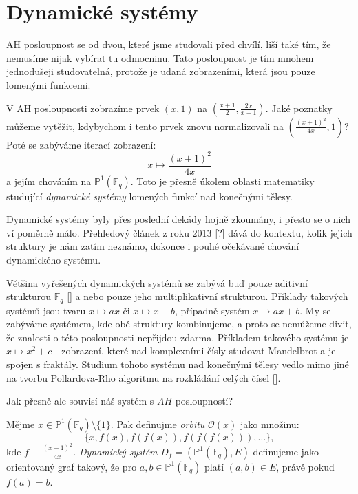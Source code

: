\documentclass[12pt]{report}
\begin{document}
\section{Dynamické systémy}

AH posloupnost se od dvou, které jsme studovali před chvílí, liší také tím, že nemusíme nijak vybírat tu  odmocninu. Tato posloupnost je tím mnohem jednodušeji studovatelná, protože je udaná zobrazeními, která jsou pouze lomenými funkcemi. 
  
V AH posloupnosti zobrazíme prvek $(x,1)$ na $\left(\frac{x+1}{2}, \frac{2x}{x+1}\right)$. Jaké poznatky můžeme vytěžit, kdybychom i tento prvek znovu normalizovali na $\left ( \frac{(x+1)^2}{4x}, 1 \right)$? Poté se zabýváme iterací zobrazení:
$$x \longmapsto \frac{(x+1)^2}{4x}$$
a jejím chováním na $\mathbb{P}^1 ( \mathbb{F}_q)$. Toto je přesně úkolem oblasti matematiky studující \textit{dynamické systémy} lomených funkcí nad konečnými tělesy.

Dynamické systémy byly přes poslední dekády hojně zkoumány, i přesto se o nich ví poměrně málo. Přehledový článek z roku 2013 [?] dává do kontextu, kolik jejich struktury je nám zatím neznámo, dokonce i pouhé očekávané chování dynamického systému. 

Většina vyřešených dynamických systémů se zabývá buď pouze aditivní strukturou $\mathbb{F}_q$ [] a nebo pouze jeho multiplikativní strukturou. Příklady takových systémů jsou tvaru $x \longmapsto ax$ či $x \longmapsto x+b$, případně systém $x \longmapsto ax+b$. My se zabýváme systémem, kde obě struktury kombinujeme, a proto se nemůžeme divit, že znalosti o této posloupnosti nepřijdou zdarma. Příkladem takového systému je $x \longmapsto x^2+c$ - zobrazení, které nad komplexními čísly studovat Mandelbrot a je spojen s fraktály. Studium tohoto systému nad konečnými tělesy vedlo mimo jiné na tvorbu Pollardova-Rho algoritmu na rozkládání celých čísel [].

Jak přesně ale souvisí náš systém s $AH$ posloupností? 

\begin{definice}
Mějme $x \in \mathbb{P}^{1}(\mathbb{F}_q) \setminus \lbrace 1 \rbrace$. Pak definujme \textit{orbitu} $\mathcal{O}(x)$ jako množinu:
$$\lbrace x,f(x),f(f(x)),f(f(f(x))),\dots \rbrace,$$
kde $f \equiv \frac{(x+1)^2}{4x}$. \textit{Dynamický systém} $D_f = (\mathbb{P}^{1}(\mathbb{F}_q),E)$ definujeme jako orientovaný graf takový, že pro $a,b \in \mathbb{P}^{1}(\mathbb{F}_q)$ platí $(a,b) \in E$, právě pokud $f(a)=b$.
\end{definice}
\end{document}
